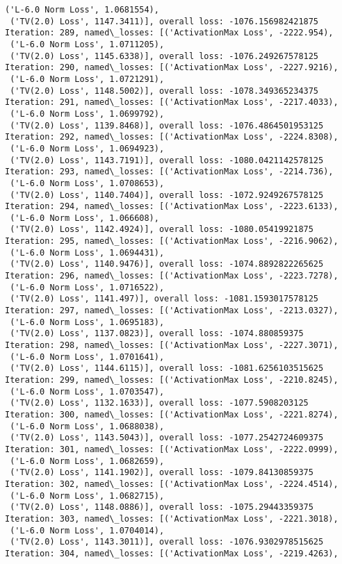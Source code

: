\documentclass[10pt]{article}
\begin{document}
\begin{Verbatim}[commandchars=\\\{\}]
 ('L-6.0 Norm Loss', 1.0681554),
 ('TV(2.0) Loss', 1147.3411)], overall loss: -1076.156982421875
Iteration: 289, named\_losses: [('ActivationMax Loss', -2222.954),
 ('L-6.0 Norm Loss', 1.0711205),
 ('TV(2.0) Loss', 1145.6338)], overall loss: -1076.249267578125
Iteration: 290, named\_losses: [('ActivationMax Loss', -2227.9216),
 ('L-6.0 Norm Loss', 1.0721291),
 ('TV(2.0) Loss', 1148.5002)], overall loss: -1078.349365234375
Iteration: 291, named\_losses: [('ActivationMax Loss', -2217.4033),
 ('L-6.0 Norm Loss', 1.0699792),
 ('TV(2.0) Loss', 1139.8468)], overall loss: -1076.4864501953125
Iteration: 292, named\_losses: [('ActivationMax Loss', -2224.8308),
 ('L-6.0 Norm Loss', 1.0694923),
 ('TV(2.0) Loss', 1143.7191)], overall loss: -1080.0421142578125
Iteration: 293, named\_losses: [('ActivationMax Loss', -2214.736),
 ('L-6.0 Norm Loss', 1.0708653),
 ('TV(2.0) Loss', 1140.7404)], overall loss: -1072.9249267578125
Iteration: 294, named\_losses: [('ActivationMax Loss', -2223.6133),
 ('L-6.0 Norm Loss', 1.066608),
 ('TV(2.0) Loss', 1142.4924)], overall loss: -1080.05419921875
Iteration: 295, named\_losses: [('ActivationMax Loss', -2216.9062),
 ('L-6.0 Norm Loss', 1.0694431),
 ('TV(2.0) Loss', 1140.9476)], overall loss: -1074.8892822265625
Iteration: 296, named\_losses: [('ActivationMax Loss', -2223.7278),
 ('L-6.0 Norm Loss', 1.0716522),
 ('TV(2.0) Loss', 1141.497)], overall loss: -1081.1593017578125
Iteration: 297, named\_losses: [('ActivationMax Loss', -2213.0327),
 ('L-6.0 Norm Loss', 1.0695183),
 ('TV(2.0) Loss', 1137.0823)], overall loss: -1074.880859375
Iteration: 298, named\_losses: [('ActivationMax Loss', -2227.3071),
 ('L-6.0 Norm Loss', 1.0701641),
 ('TV(2.0) Loss', 1144.6115)], overall loss: -1081.6256103515625
Iteration: 299, named\_losses: [('ActivationMax Loss', -2210.8245),
 ('L-6.0 Norm Loss', 1.0703547),
 ('TV(2.0) Loss', 1132.1633)], overall loss: -1077.5908203125
Iteration: 300, named\_losses: [('ActivationMax Loss', -2221.8274),
 ('L-6.0 Norm Loss', 1.0688038),
 ('TV(2.0) Loss', 1143.5043)], overall loss: -1077.2542724609375
Iteration: 301, named\_losses: [('ActivationMax Loss', -2222.0999),
 ('L-6.0 Norm Loss', 1.0682659),
 ('TV(2.0) Loss', 1141.1902)], overall loss: -1079.84130859375
Iteration: 302, named\_losses: [('ActivationMax Loss', -2224.4514),
 ('L-6.0 Norm Loss', 1.0682715),
 ('TV(2.0) Loss', 1148.0886)], overall loss: -1075.29443359375
Iteration: 303, named\_losses: [('ActivationMax Loss', -2221.3018),
 ('L-6.0 Norm Loss', 1.0704014),
 ('TV(2.0) Loss', 1143.3011)], overall loss: -1076.9302978515625
Iteration: 304, named\_losses: [('ActivationMax Loss', -2219.4263),

\end{Verbatim}
\end{document}
